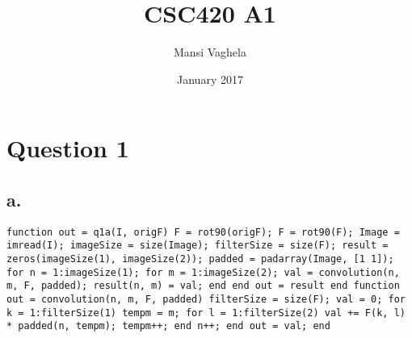 \documentclass{article}
\title{CSC420 A1}
\author{Mansi Vaghela}
\date{January 2017}
\begin{document}
\maketitle

\section*{Question 1}

\subsection*{a.}

\texttt{function out = q1a(I, origF)
\newline\indent
  F = rot90(origF);
  \newline\indent
  F = rot90(F);
  \newline\indent
  Image = imread(I);
  \newline\indent
  imageSize = size(Image);
  \newline\indent
  filterSize = size(F);
  \newline\indent
  result = zeros(imageSize(1), imageSize(2));
  \newline\indent
  padded = padarray(Image, [1 1]);
  \newline\indent
  for n = 1:imageSize(1);
  \newline\indent\indent
    for m = 1:imageSize(2);
    \newline\indent\indent\indent
      val = convolution(n, m, F, padded);
      \newline\indent\indent\indent
      result(n, m) = val;
      \newline\indent\indent
    end
    \newline\indent
  end
  \newline\indent
  out = result
  \newline
end
\newline\newline
function out = convolution(n, m, F, padded)
\newline\indent
  filterSize = size(F);
  \newline\indent
  val = 0;
  \newline\indent
  for k = 1:filterSize(1)
  \newline\indent\indent
  tempm = m;
  \newline\indent\indent
    for l = 1:filterSize(2)
    \newline\indent\indent\indent
      val += F(k, l) * padded(n, tempm);
      \newline\indent\indent\indent
      tempm++;
     \newline\indent\indent
     end
     \newline\indent\indent
     n++;
     \newline\indent
  end
  \newline\indent
  out = val;
  \newline
end
}
\end{document}

